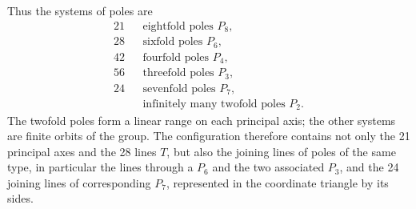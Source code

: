 \documentclass[11pt]{article}
\begin{document}
Thus the systems of poles are
\begin{equation}
\begin{array}{rcl}
21&&\text{eightfold poles }P_8,\\
28&&\text{sixfold poles }P_6,\\
42&&\text{fourfold poles }P_4,\\
56&&\text{threefold poles }P_3,\\
24&&\text{sevenfold poles }P_7,\\
&&\text{infinitely many twofold poles }P_2.
\end{array}
\tag{2}
\end{equation}
The twofold poles form a linear range on each principal axis; the other systems are finite orbits of the group. The configuration therefore contains not only the 21 principal axes and the 28 lines \(T\), but also the joining lines of poles of the same type, in particular the lines through a \(P_6\) and the two associated \(P_3\), and the 24 joining lines of corresponding \(P_7\), represented in the coordinate triangle by its sides.

\clearpage
\end{document}
